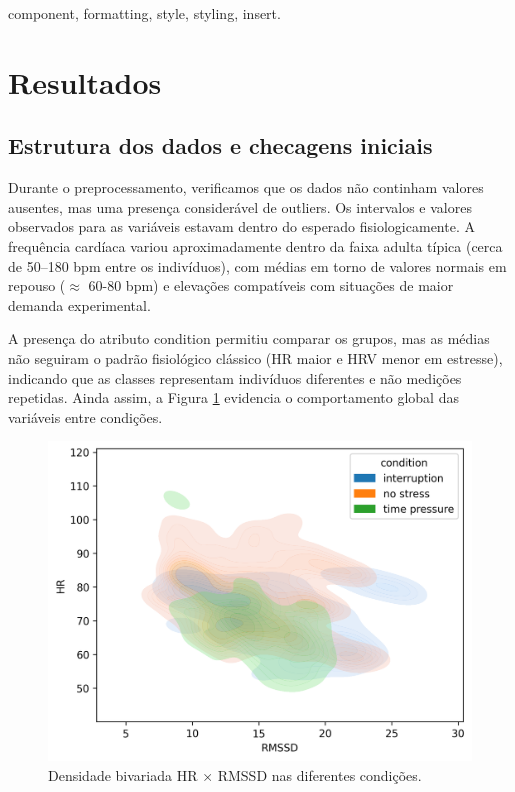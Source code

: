 \documentclass[conference]{IEEEtran}
\begin{document}
\begin{IEEEkeywords}
component, formatting, style, styling, insert.
\end{IEEEkeywords}


\section{Resultados}
\subsection{Estrutura dos dados e checagens iniciais}

Durante o preprocessamento, verificamos que os dados não continham valores ausentes, mas uma presença considerável de outliers. Os intervalos e valores observados para as variáveis estavam dentro do esperado fisiologicamente. A frequência cardíaca variou aproximadamente dentro da faixa adulta típica (cerca de 50–180 bpm entre os indivíduos), com médias em torno de valores normais em repouso ($\approx$ 60-80 bpm) e elevações compatíveis com situações de maior demanda experimental.

A presença do atributo condition permitiu comparar os grupos, mas as médias não seguiram o padrão fisiológico clássico (HR maior e HRV menor em estresse), indicando que as classes representam indivíduos diferentes e não medições repetidas. Ainda assim, a Figura \ref{fig:kde_hr_rmssd} evidencia o comportamento global das variáveis entre condições.

\begin{figure}[H]
    \centering
    \includegraphics[width=0.7\linewidth]{../../../images/Anderson/kde_hr_rmssd_condition.png}
    \caption{Densidade bivariada HR × RMSSD nas diferentes condições.}
    \label{fig:kde_hr_rmssd}
\end{figure}
\end{document}
